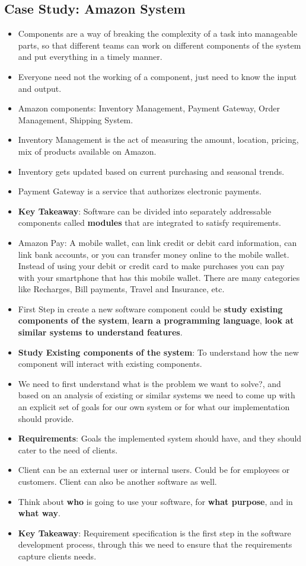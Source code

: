 \documentclass[a4paper]{article}
\begin{document}
\subsection{Case Study: Amazon System}
\begin{itemize}
    \item Components are a way of breaking the complexity of a task into manageable parts, so that different teams can work on different components of the system and put everything in a timely manner.
    \item Everyone need not the working of a component, just need to know the input and output.
    \item Amazon components: Inventory Management, Payment Gateway, Order Management, Shipping System.
    \item Inventory Management is the act of measuring the amount, location, pricing, mix of products available on Amazon.
    \item Inventory gets updated based on current purchasing and seasonal trends.
    \item Payment Gateway is a service that authorizes electronic payments.
    \item \textbf{Key Takeaway}: Software can be divided into separately addressable components called \textbf{modules} that are integrated to satisfy requirements.
    \item Amazon Pay: A mobile wallet, can link credit or debit card information, can link bank accounts, or you can transfer money online to the mobile wallet. Instead of using your debit or credit card to make purchases you can pay with your smartphone that has this mobile wallet. There are many categories like Recharges, Bill payments, Travel and Insurance, etc.
    \item First Step in create a new software component could be \textbf{study existing components of the system}, \textbf{learn a programming language}, \textbf{look at similar systems to understand features}.
    \item \textbf{Study Existing components of the system}: To understand how the new component will interact with existing components.
    \item We need to first understand what is the problem we want to solve?, and based on an analysis of existing or similar systems we need to come up with an explicit set of goals for our own system or for what our implementation should provide.
    \item \textbf{Requirements}: Goals the implemented system should have, and they should cater to the need of clients.
    \item Client can be an external user or internal users. Could be for employees or customers. Client can also be another software as well.
    \item Think about \textbf{who} is going to use your software, for \textbf{what purpose}, and in \textbf{what way}.
    \item \textbf{Key Takeaway}: Requirement specification is the first step in the software development process, through this we need to ensure that the requirements capture clients needs.
\end{itemize}
\end{document}
